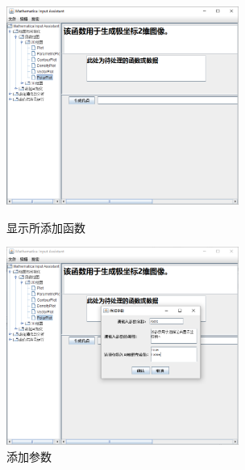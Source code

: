 \documentclass[hyperref, UTF8
,bookmarksnumbered=true, oneside]{ctexbook}
\begin{document}
            	\begin{figure}[!h]
	                \begin{minipage}[b]{0.45\textwidth}
	                \centering
	                \includegraphics[width=3in]{12.png}
	                \caption{显示所添加函数}
	                \label{pic:MathPack}
	                \end{minipage}%
	                \hspace{0.1\textwidth}%
	                \begin{minipage}[b]{0.45\textwidth}
	                \centering
	                \includegraphics[width=3in]{13.png}
	                \caption{添加参数}
	                \label{pic:GUIPack}
	                \end{minipage}
            	\end{figure}
\end{document}
